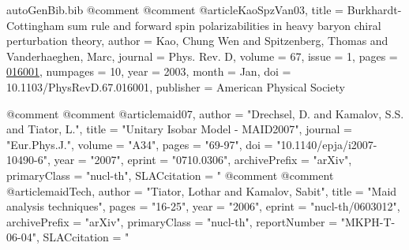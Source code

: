 \begin{filecontents*}{autoGenBib.bib}
@comment %
@comment %
@article{KaoSpzVan03,
  title = {Burkhardt-Cottingham sum rule and forward spin polarizabilities in heavy baryon chiral perturbation theory},
  author = {Kao, Chung Wen and Spitzenberg, Thomas and Vanderhaeghen, Marc},
  journal = {Phys. Rev. D},
  volume = {67},
  issue = {1},
  pages = {\href{http://link.aps.org/doi/10.1103/PhysRevD.67.016001}{016001}},
  numpages = {10},
  year = {2003},
  month = {Jan},
  doi = {10.1103/PhysRevD.67.016001},
  publisher = {American Physical Society}
}

@comment %
@comment %
@article{maid07,
      author         = "Drechsel, D. and Kamalov, S.S. and Tiator, L.",
      title          = "{Unitary Isobar Model - MAID2007}",
      journal        = "Eur.Phys.J.",
      volume         = "A34",
      pages          = "69-97",
      doi            = "10.1140/epja/i2007-10490-6",
      year           = "2007",
      eprint         = "0710.0306",
      archivePrefix  = "arXiv",
      primaryClass   = "nucl-th",
      SLACcitation   = "%
}
@comment %
@comment %
@article{maidTech,
      author         = "Tiator, Lothar and Kamalov, Sabit",
      title          = "{Maid analysis techniques}",
      pages          = "16-25",
      year           = "2006",
      eprint         = "nucl-th/0603012",
      archivePrefix  = "arXiv",
      primaryClass   = "nucl-th",
      reportNumber   = "MKPH-T-06-04",
      SLACcitation   = "%
}


\end{filecontents*}
